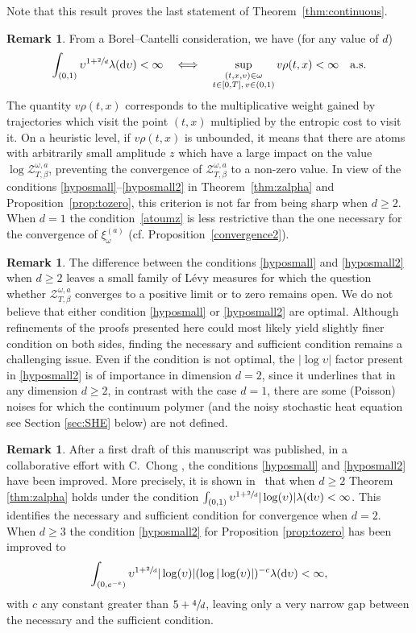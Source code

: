 \documentclass[11pt]{article}
\newcommand{\cf}{cf.\xspace}
\numberwithin{equation}{section}
\let\mathcal\mathscr
\theoremstyle{definition}
\newtheorem{rem}[theorem]{Remark}
\newcommand{\dd}{\mathrm{d}}
\newcommand{\cZ}{{\ensuremath{\mathcal Z}} }
\newcommand{\suptwo}[2]{\sup_{\substack{#1 \\ #2}}}
\let\gl\lambda
\let\ups\upsilon
\let\go\omega
\begin{document}
Note that this result proves the last statement of Theorem~\ref{thm:continuous}.

\begin{rem}
From a Borel--Cantelli consideration, we have (for any value of $d$)
\begin{equation}\label{atoumz}
\int_{(0,1)} \ups^{1+\sfrac{2}{d}} \gl(\dd \ups)<\infty \quad \Longleftrightarrow \quad
\suptwo{(t,x,v)\in \go}{ t\in [0,T],\, v\in(0,1)} v\rho(t,x)<\infty \quad \text{a.s.}
\end{equation}
The quantity $v\rho(t,x)$ corresponds to the multiplicative weight gained by trajectories which visit the point
$(t,x)$ multiplied by the entropic cost to visit it.
On a heuristic level, if $v\rho(t,x)$ is unbounded, it means that there are atoms with arbitrarily small amplitude $z$ which have a large impact on the value $\log \cZ^{\go,a}_{T,\beta}$, preventing the convergence of $\cZ^{\go,a}_{T,\beta}$ to a non-zero value.
In view of the conditions \eqref{hyposmall}--\eqref{hyposmall2} in
Theorem~\ref{thm:zalpha} and Proposition~\ref{prop:tozero}, this criterion is not far from being sharp when $d\ge 2$.
When $d=1$ the condition~\eqref{atoumz} is less restrictive than the one necessary for the convergence of $\xi^{(a)}_{\go}$ (\cf Proposition~\ref{convergence2}).
\end{rem}

\begin{rem}
The difference between the conditions \eqref{hyposmall} and \eqref{hyposmall2} when $d\ge 2$ leaves a small family of Lévy measures for which the question whether $\cZ^{\go,a}_{T,\beta}$ converges to a positive limit or to zero remains open. We do not believe that either condition \eqref{hyposmall} or \eqref{hyposmall2} are optimal. Although refinements of the proofs presented here could most likely yield slightly finer condition on both sides, finding the necessary and sufficient condition remains a challenging issue.
Even if the condition is not optimal, the $|\log \ups|$ factor present in \eqref{hyposmall2}
is of importance in dimension $d=2$, since it underlines that in any dimension $d\geq 2$, in contrast with the case $d=1$, there are some (Poisson) noises for which the continuum polymer (and the noisy stochastic heat equation see Section \ref{sec:SHE} below) are not defined.
\end{rem}

\begin{rem}
After a first draft of this manuscript was published, in a collaborative effort with C.\ Chong \cite{BCL21}, the conditions \eqref{hyposmall} and
\eqref{hyposmall2} have been improved. More precisely,
it is shown in~\cite{BCL21} that when $d\ge 2$
Theorem \ref{thm:zalpha} holds under the condition
$\int_{(0,1)} \ups^{1+\sfrac{2}{d}}|\log (\ups)| \gl(\dd \ups)<\infty$.
This identifies the necessary and sufficient condition for convergence when $d=2$. When $d\ge 3$ the condition \eqref{hyposmall2} for Proposition \ref{prop:tozero} has been improved to
\[
\int_{(0,e^{-e})} \ups^{1+\sfrac{2}{d}}|\log (\ups)| (\log |\log (\ups)|)^{-c}\gl(\dd \ups)<\infty,
\]
with $c$ any constant greater than $5+\sfrac4d$,
leaving only a very narrow gap between the necessary and the sufficient condition.
\end{rem}
\end{document}

